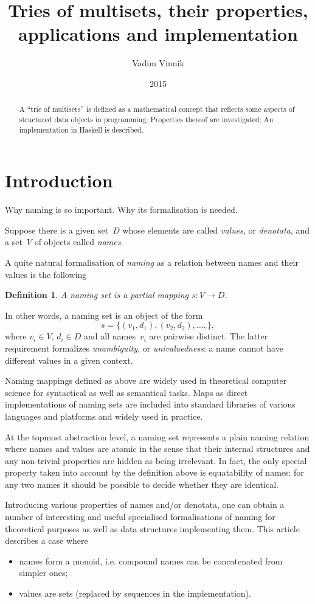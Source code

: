 \documentclass{article}
\title{Tries of multisets, their properties, applications and implementation}
\author{Vadim Vinnik}
\date{2015}
\newtheorem{Df}{Definition}
\begin{document}
\maketitle

\begin{abstract}
A ``trie of multisets'' is defined as a mathematical concept that
reflects some aspects of structured data objects in programming;
Properties thereof are investigated; An implementation in Haskell
is described.
\end{abstract}

\tableofcontents

\section{Introduction}

Why naming is so important. Why its formalisation is needed.

Suppose there is a given set~$D$ whose elements are called \emph{values}, or
\emph{denotata}, and a set~$V$ of objects called \emph{names}.

A quite natural formalisation of \emph{naming} as a relation between names and
their values is the following
\begin{Df}
A \emph{naming set} is a partial mapping $s: V\to D$.
\end{Df}

In other words, a naming set is an object of the form
\[
  s = \{ (v_1, d_1), (v_2, d_2), \ldots, \} ,
\]
where $v_i\in V$, $d_i\in D$ and all names~$v_i$ are pairwise distinct. The
latter requirement formalizes \emph{unambiguity}, or \emph{univaluedness}: a
name cannot have different values in a given context.

Naming mappings defined as above are widely used in theoretical computer
science for syntactical as well as semantical tasks. Maps as direct
implementations of naming sets are included into standard libraries of various
languages and platforms and widely used in practice.

At the topmost abstraction level, a naming set represents a plain naming
relation where names and values are atomic in the sense that their internal
structures and any non-trivial properties are hidden as being irrelevant. In
fact, the only special property taken into account by the definition above is
equatability of names: for any two names it should be possible to decide
whether they are identical.

Introducing various properties of names and/or denotata, one can obtain a
number of interesting and useful specialised formalisations of naming for
theoretical purposes as well as data structures implementing them.
This article describes a case where
\begin{itemize}
\item names form a monoid, i.e. compound names can be concatenated from
simpler ones;
\item values are sets (replaced by sequences in the implementation).
\end{itemize}
\end{document}
